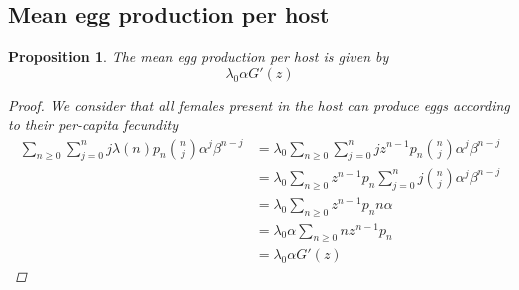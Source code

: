 \documentclass[12pt,a4paper]{article}
\theoremstyle{plain}%
\newtheorem{prop}[thm]{Proposition}
\theoremstyle{definition}
\theoremstyle{remark}
\begin{document}
	\subsection{Mean egg production per host}
	\begin{prop}\label{prodhuevos}
		The mean egg production per host is given by
		\begin{equation*}
		\lambda_0\alpha G'(z)
		\end{equation*}
		\begin{proof}
			We consider that all females present in the host can produce eggs according to their  per-capita fecundity
			\begin{equation*}
			\begin{split}
			\sum_{n\geq 0}\sum_{j=0}^{n}j\lambda(n)p_n\binom{n}{j}\alpha^j\beta^{n-j}
			&=\lambda_0\sum_{n\geq 0}\sum_{j=0}^{n}jz^{n-1}p_n\binom{n}{j}\alpha^j\beta^{n-j}\\
			&=\lambda_0\sum_{n\geq 0}z^{n-1}p_n\sum_{j=0}^{n} j\binom{n}{j}\alpha^j\beta^{n-j}\\
			&=\lambda_0\sum_{n\geq 0}z^{n-1}p_nn\alpha\\
			&=\lambda_0\alpha  \sum_{n\geq 0}nz^{n-1}p_n \\
			&=\lambda_0\alpha G'(z)
			\end{split}
			\end{equation*}
		\end{proof}
	\end{prop}
	
\end{document}
